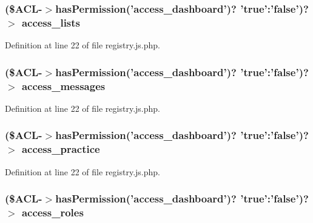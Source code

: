 \hypertarget{registry_8js_8php_a67c79d708f95250a42430f4155ff9169}{
\subsubsection[{access\-\_\-lists}]{ (\${\bf \-A\-C\-L}-\/$>$has\-Permission('access\-\_\-dashboard')? 'true'\-:'false')?$>$ {\bf access\-\_\-lists}}}\label{registry_8js_8php_a67c79d708f95250a42430f4155ff9169}


\-Definition at line 22 of file registry.\-js.\-php.

\hypertarget{registry_8js_8php_acb1a6640ff0a1d474e646f76056e79c1}{
\subsubsection[{access\-\_\-messages}]{ (\${\bf \-A\-C\-L}-\/$>$has\-Permission('access\-\_\-dashboard')? 'true'\-:'false')?$>$ {\bf access\-\_\-messages}}}\label{registry_8js_8php_acb1a6640ff0a1d474e646f76056e79c1}


\-Definition at line 22 of file registry.\-js.\-php.

\hypertarget{registry_8js_8php_a8f444653c7c6d0819aac674bfde2c328}{
\subsubsection[{access\-\_\-practice}]{ (\${\bf \-A\-C\-L}-\/$>$has\-Permission('access\-\_\-dashboard')? 'true'\-:'false')?$>$ {\bf access\-\_\-practice}}}\label{registry_8js_8php_a8f444653c7c6d0819aac674bfde2c328}


\-Definition at line 22 of file registry.\-js.\-php.

\hypertarget{registry_8js_8php_ab35433fee89acf4720f088bfb8012874}{
\subsubsection[{access\-\_\-roles}]{ (\${\bf \-A\-C\-L}-\/$>$has\-Permission('access\-\_\-dashboard')? 'true'\-:'false')?$>$ {\bf access\-\_\-roles}}}\label{registry_8js_8php_ab35433fee89acf4720f088bfb8012874}


